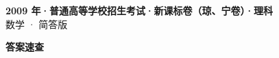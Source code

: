 \documentclass[zihao=-4, a4paper]{ctexart}
\begin{document}
\begin{center}
  {\Large\bfseries 2009 年·普通高等学校招生考试·新课标卷（琼、宁卷）·理科}\\[4pt]
  {\large 数学 · 简答版}
\end{center}
\medskip
{}

\clearpage
{}
\begin{center}{\Large\bfseries 答案速查}\end{center}
\medskip

\end{document}
